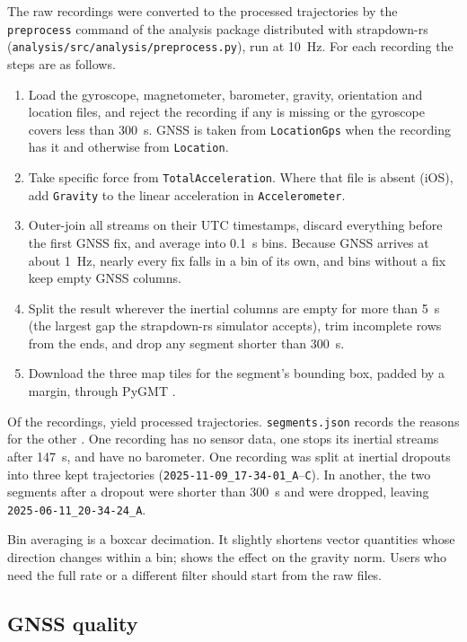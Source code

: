 The raw recordings were converted to the processed trajectories by the \texttt{preprocess} command of the analysis package distributed with strapdown-rs \citep{strapdown-rs} (\texttt{analysis/src/analysis/preprocess.py}), run at 10~Hz. For each recording the steps are as follows.
\begin{enumerate}
\item Load the gyroscope, magnetometer, barometer, gravity, orientation and location files, and reject the recording if any is missing or the gyroscope covers less than 300~s. GNSS is taken from \texttt{LocationGps} when the recording has it and otherwise from \texttt{Location}.
\item Take specific force from \texttt{TotalAcceleration}. Where that file is absent (iOS), add \texttt{Gravity} to the linear acceleration in \texttt{Accelerometer}.
\item Outer-join all streams on their UTC timestamps, discard everything before the first GNSS fix, and average into 0.1~s bins. Because GNSS arrives at about 1~Hz, nearly every fix falls in a bin of its own, and bins without a fix keep empty GNSS columns.
\item Split the result wherever the inertial columns are empty for more than 5~s (the largest gap the strapdown-rs simulator accepts), trim incomplete rows from the ends, and drop any segment shorter than 300~s.
\item Download the three map tiles for the segment's bounding box, padded by a margin, through PyGMT \citep{wessel2019gmt}.
\end{enumerate}
Of the \numRawRecordings{} recordings, \numUsedRecordings{} yield processed trajectories. \texttt{segments.json} records the reasons for the other \numExcludedRecordings{}. One recording has no sensor data, one stops its inertial streams after 147~s, and \numNoBaroRecordings{} have no barometer. One recording was split at inertial dropouts into three kept trajectories (\texttt{2025-11-09\_17-34-01\_A}--\texttt{C}). In another, the two segments after a dropout were shorter than 300~s and were dropped, leaving \texttt{2025-06-11\_20-34-24\_A}.

Bin averaging is a boxcar decimation. It slightly shortens vector quantities whose direction changes within a bin;  shows the effect on the gravity norm. Users who need the full rate or a different filter should start from the raw files.

\subsection{GNSS quality}
\label{sec:gnss}

